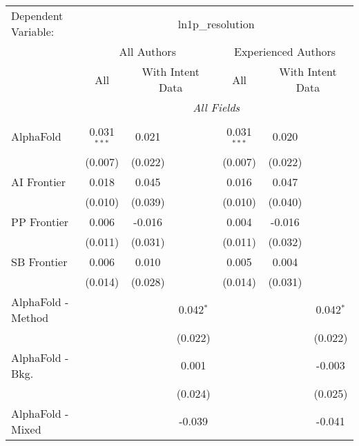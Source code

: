 \begingroup
\centering
\begin{tabular}{lcccccc}
   \tabularnewline \midrule \midrule
   Dependent Variable: & \multicolumn{6}{c}{ln1p\_resolution}\\
 & \multicolumn{3}{c}{All Authors} & \multicolumn{3}{c}{Experienced Authors} \\
\cmidrule(lr){2-4} \cmidrule(lr){5-7}
 & \multicolumn{1}{c}{All} & \multicolumn{2}{c}{With Intent Data} & \multicolumn{1}{c}{All} & \multicolumn{2}{c}{With Intent Data} \\
\cmidrule(lr){2-2} \cmidrule(lr){3-4} \cmidrule(lr){5-5} \cmidrule(lr){6-7}
 & \multicolumn{6}{c}{\textit{All Fields}} \\ \\
   AlphaFold            & 0.031$^{***}$ & 0.021   &             & 0.031$^{***}$ & 0.020   &   \\   
                        & (0.007)       & (0.022) &             & (0.007)       & (0.022) &   \\   
   AI Frontier          & 0.018         & 0.045   &             & 0.016         & 0.047   &   \\   
                        & (0.010)       & (0.039) &             & (0.010)       & (0.040) &   \\   
   PP Frontier          & 0.006         & -0.016  &             & 0.004         & -0.016  &   \\   
                        & (0.011)       & (0.031) &             & (0.011)       & (0.032) &   \\   
   SB Frontier          & 0.006         & 0.010   &             & 0.005         & 0.004   &   \\   
                        & (0.014)       & (0.028) &             & (0.014)       & (0.031) &   \\   
   AlphaFold - Method   &               &         & 0.042$^{*}$ &               &         & 0.042$^{*}$\\   
                        &               &         & (0.022)     &               &         & (0.022)\\   
   AlphaFold - Bkg.     &               &         & 0.001       &               &         & -0.003\\   
                        &               &         & (0.024)     &               &         & (0.025)\\   
   AlphaFold - Mixed    &               &         & -0.039      &               &         & -0.041\\   

\end{tabular}
